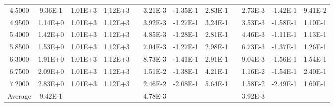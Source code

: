 \begin{center}
\begin{table}[h]
\begin{tabular}{cccccccccccc}
    4.5000 &   9.36E-1 &   1.01E+3 &   1.12E+3 &  &   3.21E-3 &  -1.35E-1 &   2.83E-1 &  &   2.73E-3 &  -1.42E-1 &   9.41E-2 \\
    4.9500 &   1.14E+0 &   1.01E+3 &   1.12E+3 &  &   3.92E-3 &  -1.27E-1 &   3.24E-1 &  &   3.53E-3 &  -1.58E-1 &   1.10E-1 \\
    5.4000 &   1.42E+0 &   1.01E+3 &   1.12E+3 &  &   4.85E-3 &  -1.28E-1 &   2.81E-1 &  &   4.46E-3 &  -1.11E-1 &   1.13E-1 \\
    5.8500 &   1.53E+0 &   1.01E+3 &   1.12E+3 &  &   7.04E-3 &  -1.27E-1 &   2.98E-1 &  &   6.73E-3 &  -1.37E-1 &   1.26E-1 \\
    6.3000 &   1.91E+0 &   1.01E+3 &   1.12E+3 &  &   8.73E-3 &  -1.41E-1 &   2.91E-1 &  &   9.04E-3 &  -1.56E-1 &   1.54E-1 \\
    6.7500 &   2.09E+0 &   1.01E+3 &   1.12E+3 &  &   1.51E-2 &  -1.38E-1 &   4.21E-1 &  &   1.16E-2 &  -1.54E-1 &   2.40E-1 \\
    7.2000 &   2.83E+0 &   1.01E+3 &   1.12E+3 &  &   2.46E-2 &  -2.08E-1 &   5.64E-1 &  &   1.58E-2 &  -2.49E-1 &   1.60E-1 \\
 \hline
Average &  9.42E-1& & & &  4.78E-3& & & &  3.92E-3\\
  \hline
 \end{tabular}
 \label{tab:ANH-E-1SOR10-error}
 \end{table}
\end{center}


